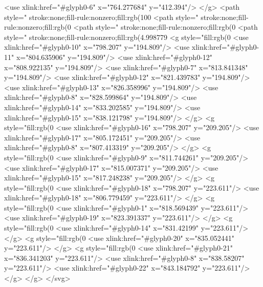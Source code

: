   <use xlink:href="#glyph0-6" x="764.277684" y="412.394"/>
</g>
<path style=" stroke:none;fill-rule:nonzero;fill:rgb(100%
<path style=" stroke:none;fill-rule:nonzero;fill:rgb(0%
<path style=" stroke:none;fill-rule:nonzero;fill:rgb(0%
<path style=" stroke:none;fill-rule:nonzero;fill:rgb(4.998779%
<g style="fill:rgb(0%
  <use xlink:href="#glyph0-10" x="798.207" y="194.809"/>
  <use xlink:href="#glyph0-11" x="804.635906" y="194.809"/>
  <use xlink:href="#glyph0-12" x="808.922135" y="194.809"/>
  <use xlink:href="#glyph0-7" x="813.841348" y="194.809"/>
  <use xlink:href="#glyph0-12" x="821.439783" y="194.809"/>
  <use xlink:href="#glyph0-13" x="826.358996" y="194.809"/>
  <use xlink:href="#glyph0-8" x="828.599864" y="194.809"/>
  <use xlink:href="#glyph0-14" x="833.202585" y="194.809"/>
  <use xlink:href="#glyph0-15" x="838.121798" y="194.809"/>
</g>
<g style="fill:rgb(0%
  <use xlink:href="#glyph0-16" x="798.207" y="209.205"/>
  <use xlink:href="#glyph0-17" x="805.172451" y="209.205"/>
  <use xlink:href="#glyph0-8" x="807.413319" y="209.205"/>
</g>
<g style="fill:rgb(0%
  <use xlink:href="#glyph0-9" x="811.744261" y="209.205"/>
  <use xlink:href="#glyph0-17" x="815.007371" y="209.205"/>
  <use xlink:href="#glyph0-15" x="817.248238" y="209.205"/>
</g>
<g style="fill:rgb(0%
  <use xlink:href="#glyph0-18" x="798.207" y="223.611"/>
  <use xlink:href="#glyph0-18" x="806.779459" y="223.611"/>
</g>
<g style="fill:rgb(0%
  <use xlink:href="#glyph0-1" x="818.569439" y="223.611"/>
  <use xlink:href="#glyph0-19" x="823.391337" y="223.611"/>
</g>
<g style="fill:rgb(0%
  <use xlink:href="#glyph0-14" x="831.42199" y="223.611"/>
</g>
<g style="fill:rgb(0%
  <use xlink:href="#glyph0-20" x="835.052441" y="223.611"/>
</g>
<g style="fill:rgb(0%
  <use xlink:href="#glyph0-21" x="836.341203" y="223.611"/>
  <use xlink:href="#glyph0-8" x="838.58207" y="223.611"/>
  <use xlink:href="#glyph0-22" x="843.184792" y="223.611"/>
</g>
</g>
</svg>

